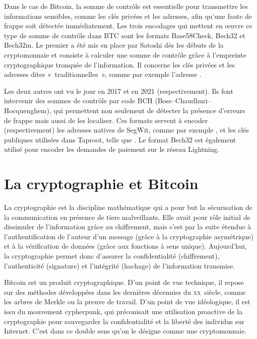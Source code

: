 Dans le cas de Bitcoin, la somme de contrôle est essentielle pour transmettre les informations sensibles, comme les clés privées et les adresses, afin qu'une faute de frappe soit détectée immédiatement. Les trois encodages qui mettent en œuvre ce type de somme de contrôle dans BTC sont les formats Base58Check, Bech32 et Bech32m. Le premier a été mis en place par Satoshi dès les débuts de la cryptomonnaie et consiste à calculer une somme de contrôle grâce à l'empreinte cryptographique tronquée de l'information. Il concerne les clés privées et les adresses dites «~traditionnelles~», comme par exemple l'adresse .

Les deux autres ont vu le jour en 2017 et en 2021 (respectivement). Ils font intervenir des sommes de contrôle par code BCH (Bose–Chaudhuri–Hocquenghem), qui permettent non seulement de détecter la présence d'erreurs de frappe mais aussi de les localiser. Ces formats servent à encoder (respectivement) les adresses natives de SegWit, comme par exemple , et les clés publiques utilisées dans Taproot, telle que . Le format Bech32 est également utilisé pour encoder les demandes de paiement sur le réseau Lightning.

\section*{La cryptographie et Bitcoin}

La cryptographie est la discipline mathématique qui a pour but la sécurisation de la communication en présence de tiers malveillants. Elle avait pour rôle initial de dissimuler de l'information grâce au chiffrement, mais s'est par la suite étendue à l'authentification de l'auteur d'un message (grâce à la cryptographie asymétrique) et à la vérification de données (grâce aux fonctions à sens unique). Aujourd'hui, la cryptographie permet donc d'assurer la confidentialité (chiffrement), l'authenticité (signature) et l'intégrité (hachage) de l'information transmise.

Bitcoin est un produit cryptographique. D'un point de vue technique, il repose sur des méthodes développées dans les dernières décennies du \textsc{xx}\ieme{}~siècle, comme les arbres de Merkle ou la preuve de travail. D'un point de vue idéologique, il est issu du mouvement cypherpunk, qui préconisait une utilisation proactive de la cryptographie pour sauvegarder la confidentialité et la liberté des individus sur Internet. C'est dans ce double sens qu'on le désigne comme une cryptomonnaie.

